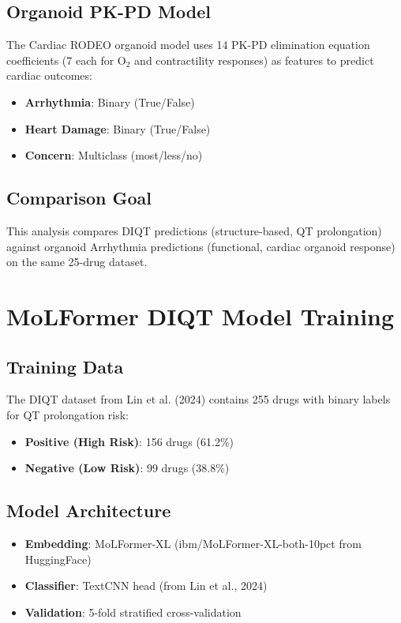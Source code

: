 \documentclass[11pt]{article}
\begin{document}
\subsection{Organoid PK-PD Model}
The Cardiac RODEO organoid model uses 14 PK-PD elimination equation coefficients (7 each for O$_2$ and contractility responses) as features to predict cardiac outcomes:
\begin{itemize}
    \item \textbf{Arrhythmia}: Binary (True/False)
    \item \textbf{Heart Damage}: Binary (True/False)
    \item \textbf{Concern}: Multiclass (most/less/no)
\end{itemize}

\subsection{Comparison Goal}
This analysis compares DIQT predictions (structure-based, QT prolongation) against organoid Arrhythmia predictions (functional, cardiac organoid response) on the same 25-drug dataset.


\section{MoLFormer DIQT Model Training}

\subsection{Training Data}
The DIQT dataset from Lin et al. (2024) contains 255 drugs with binary labels for QT prolongation risk:
\begin{itemize}
    \item \textbf{Positive (High Risk)}: 156 drugs (61.2\%)
    \item \textbf{Negative (Low Risk)}: 99 drugs (38.8\%)
\end{itemize}

\subsection{Model Architecture}
\begin{itemize}
    \item \textbf{Embedding}: MoLFormer-XL (ibm/MoLFormer-XL-both-10pct from HuggingFace)
    \item \textbf{Classifier}: TextCNN head (from Lin et al., 2024)
    \item \textbf{Validation}: 5-fold stratified cross-validation
\end{itemize}
\end{document}

